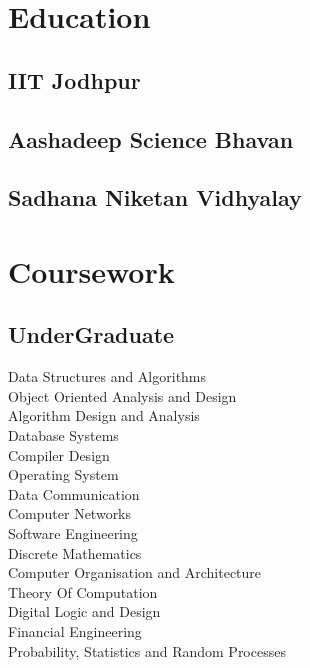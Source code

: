 \documentclass[a4paper]{deedy-resume-openfont}
\begin{document}
{}

\begin{minipage}[t]{0.36\textwidth}

\section{Education}

\subsection{IIT Jodhpur}
\sectionsep

\subsection{Aashadeep Science Bhavan}
\sectionsep

\subsection{Sadhana Niketan Vidhyalay}
\sectionsep

\section{Coursework}
\subsection{UnderGraduate}
Data Structures and Algorithms \\
Object Oriented Analysis and Design \\
Algorithm Design and Analysis \\
Database Systems \\
Compiler Design \\
Operating System \\
Data Communication \\
Computer Networks \\
Software Engineering \\
Discrete Mathematics \\
Computer Organisation and Architecture \\
Theory Of Computation \\ 
Digital Logic and Design \\
Financial Engineering \\
Probability, Statistics and Random Processes
\sectionsep


\end{minipage}
\end{document}
